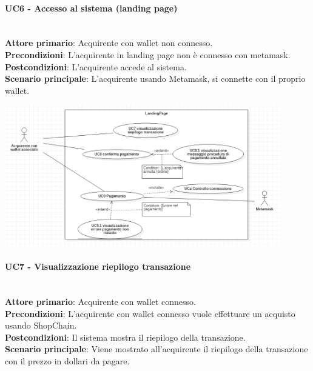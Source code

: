 \documentclass[a4paper, 12pt]{article}
\begin{document}
\paragraph{UC6 - Accesso al sistema (landing page)}\\
\textbf{Attore primario}: Acquirente con wallet non connesso.\\
\textbf{Precondizioni}: L'acquirente in landing page non è connesso con metamask.\\
\textbf{Postcondizioni}: L'acquirente accede al sistema.\\
\textbf{Scenario principale}:
L'acquirente usando Metamask, si connette con il proprio wallet.

\includegraphics[width=0.9\textwidth]{UC_LP2}

\paragraph{UC7 - Visualizzazione riepilogo transazione}\\
\textbf{Attore primario}: Acquirente con wallet connesso.\\
\textbf{Precondizioni}: L'acquirente con wallet connesso vuole effettuare un acquisto usando ShopChain.\\
\textbf{Postcondizioni}: Il sistema mostra il riepilogo della transazione.\\
\textbf{Scenario principale}:
Viene mostrato all'acquirente il riepilogo della transazione con il prezzo in dollari da pagare.
\end{document}
